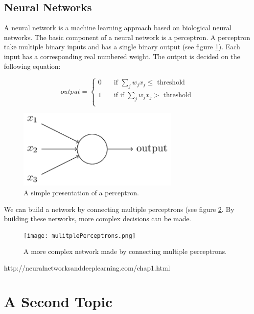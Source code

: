 	
	\subsection{Neural Networks}
	
A neural network is a machine learning approach based on biological neural networks. The basic component of a neural network is a perceptron. A perceptron take multiple binary inputs and has a single binary output (see figure \ref{fig:perceptron}). Each input has a corresponding real numbered weight. The output is decided on the following equation:

\begin{equation} 
output =
  \begin{cases}
    0       	& \quad \text{if } \sum_j w_jx_j \leq \text{ threshold}\\
    1  		& \quad \text{if } \text{if } \sum_j w_jx_j > \text{ threshold}\\
  \end{cases}
\end{equation}
	
\begin{figure}[H]
	\centering
	\includegraphics[width=8cm]{perceptron.png}
	\caption{A simple presentation of a perceptron.}
	\label{fig:perceptron}
\end{figure}

We can build a network by connecting multiple perceptrons (see figure \ref{fig:multiplePerceptrons}. By building these networks, more complex decisions can be made.

\begin{figure}[H]
	\centering
	\texttt{[image: mulitplePerceptrons.png]}
	\caption{A more complex network made by connecting multiple perceptrons.}
	\label{fig:multiplePerceptrons}
\end{figure}

http://neuralnetworksanddeeplearning.com/chap1.html

\section{A Second Topic}
\lipsum[64]

